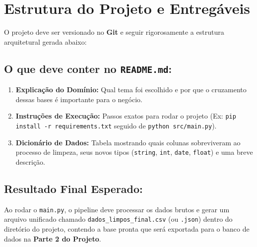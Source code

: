 \documentclass[12pt,a4paper]{article}
\begin{document}
	\section{Estrutura do Projeto e Entregáveis}
	O projeto deve ser versionado no \textbf{Git} e seguir rigorosamente a estrutura arquitetural gerada abaixo:
	
	\vspace{0.3cm}
	\begin{minipage}{\textwidth}
	\end{minipage}
	\vspace{0.4cm}
	
	\subsection*{O que deve conter no \texttt{README.md}:}
	\begin{enumerate}
		\item \textbf{Explicação do Domínio:} Qual tema foi escolhido e por que o cruzamento dessas bases é importante para o negócio.
		\item \textbf{Instruções de Execução:} Passos exatos para rodar o projeto (Ex: \texttt{pip install -r requirements.txt} seguido de \texttt{python src/main.py}).
		\item \textbf{Dicionário de Dados:} Tabela mostrando quais colunas sobreviveram ao processo de limpeza, seus novos tipos (\texttt{string}, \texttt{int}, \texttt{date}, \texttt{float}) e uma breve descrição.
	\end{enumerate}
	
	\subsection*{Resultado Final Esperado:}
	Ao rodar o \texttt{main.py}, o pipeline deve processar os dados brutos e gerar um arquivo unificado chamado \texttt{dados\_limpos\_final.csv} (ou \texttt{.json}) dentro do diretório do projeto, contendo a base pronta que será exportada para o banco de dados na \textbf{Parte 2 do Projeto}.
	
\end{document}

